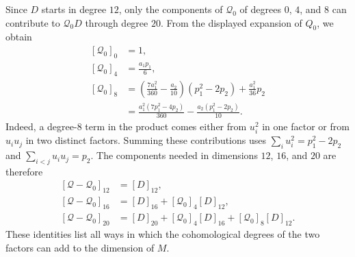\documentclass[14pt,dvipsnames]{extarticle}
\makeatletter
\numberwithin{equation}{subsection}
\theoremstyle{plain}
\theoremstyle{definition}
\theoremstyle{definition}
\renewenvironment{proof}[1][\proofname]{
 \par\pushQED{\qed}\normalfont
 \topsep6\p@\@plus6\p@\relax
 \trivlist\item[\hskip\labelsep\bfseries\itshape #1\@addpunct{.}]
}{\popQED\endtrivlist\@endpefalse}
\makeatother
\begin{document}
\begin{proof}[Proof of \cref{thm:bc-spin-below24}]
Since $D$ starts in degree $12$, only the components of $\mathcal Q_0$ of
degrees $0$, $4$, and $8$ can contribute to $\mathcal Q_0D$ through degree
$20$. From the displayed expansion of $Q_0$, we obtain
\[
 \begin{aligned}
  [\mathcal Q_0]_0&=1,\\
  [\mathcal Q_0]_4&=\frac{a_1p_1}{6},\\
  [\mathcal Q_0]_8
  &=\left(\frac{7a_1^2}{360}-\frac{a_2}{10}\right)(p_1^2-2p_2)
    +\frac{a_1^2}{36}p_2\\
  &=\frac{a_1^2(7p_1^2-4p_2)}{360}
    -\frac{a_2(p_1^2-2p_2)}{10}.
 \end{aligned}
\]
Indeed, a degree-$8$ term in the product comes either from $u_i^2$ in
one factor or from $u_i u_j$ in two distinct factors. Summing these
contributions uses $\sum_i u_i^2=p_1^2-2p_2$ and
$\sum_{i<j}u_i u_j=p_2$.
The components needed in dimensions $12$, $16$, and $20$ are therefore
\[
 \begin{aligned}
  [\mathcal Q-\mathcal Q_0]_{12}
   &=[D]_{12},\\
  [\mathcal Q-\mathcal Q_0]_{16}
   &=[D]_{16}+[\mathcal Q_0]_4[D]_{12},\\
  [\mathcal Q-\mathcal Q_0]_{20}
   &=[D]_{20}+[\mathcal Q_0]_4[D]_{16}
     +[\mathcal Q_0]_8[D]_{12}.
 \end{aligned}
\]
These identities list all ways in which the cohomological degrees of the
two factors can add to the dimension of $M$.


\end{proof}
\end{document}
